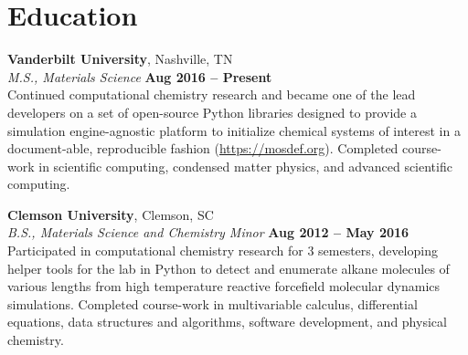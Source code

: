 \section{\mysidestyle Education}

\textbf{Vanderbilt University}, Nashville, TN \vspace{2mm}\\\vspace{1mm}%
\textsl{M.S., Materials Science} \hfill \textbf{Aug 2016 -- Present}\\
Continued computational chemistry research and became one of the lead developers on a set of open-source Python libraries designed to provide a simulation engine-agnostic platform to initialize chemical systems of interest in a document-able, reproducible fashion (\url{https://mosdef.org}).
Completed course-work in scientific computing, condensed matter physics, and advanced scientific computing.


\textbf{Clemson University}, Clemson, SC \vspace{2mm}\\\vspace{1mm}%
\textsl{B.S., Materials Science and Chemistry Minor} \hfill \textbf{Aug 2012 -- May 2016}\\
Participated in computational chemistry research for 3 semesters, developing helper tools for the lab in Python to detect and enumerate alkane molecules of various lengths from high temperature reactive forcefield molecular dynamics simulations.
Completed course-work in multivariable calculus, differential equations, data structures and algorithms, software development, and physical chemistry.
